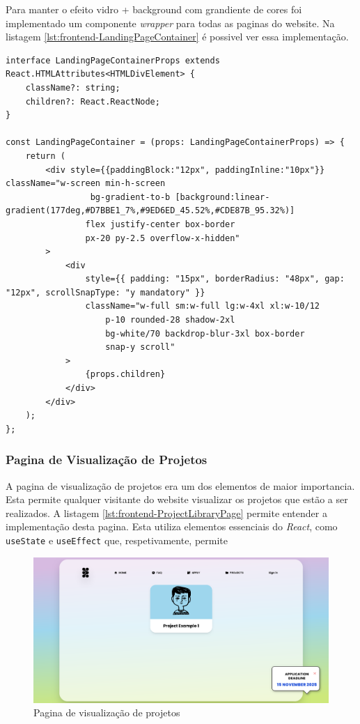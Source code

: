 Para manter o efeito vidro + background com grandiente de cores foi implementado um componente \textit{wrapper} para todas as paginas do website. Na listagem \ref{lst:frontend-LandingPageContainer} é possivel ver essa implementação.

\begin{lstlisting}[caption={Função LandingPageContainer}, label={lst:frontend-LandingPageContainer}]
interface LandingPageContainerProps extends React.HTMLAttributes<HTMLDivElement> {
	className?: string;
    children?: React.ReactNode;
}

const LandingPageContainer = (props: LandingPageContainerProps) => {
    return (
        <div style={{paddingBlock:"12px", paddingInline:"10px"}} className="w-screen min-h-screen
            	 bg-gradient-to-b [background:linear-gradient(177deg,#D7BBE1_7%,#9ED6ED_45.52%,#CDE87B_95.32%)]
            	flex justify-center box-border
				px-20 py-2.5 overflow-x-hidden"
		>
			<div
				style={{ padding: "15px", borderRadius: "48px", gap: "12px", scrollSnapType: "y mandatory" }}
				className="w-full sm:w-full lg:w-4xl xl:w-10/12
            		p-10 rounded-28 shadow-2xl
            		bg-white/70 backdrop-blur-3xl box-border
					snap-y scroll"
			>
				{props.children}
			</div>
		</div>
    );
};
\end{lstlisting}

\subsubsection{Pagina de Visualização de Projetos}

A pagina de visualização de projetos era um dos elementos de maior importancia. Esta permite qualquer visitante do website visualizar os projetos que estão a ser realizados. A listagem \ref{lst:frontend-ProjectLibraryPage} permite entender a implementação desta pagina. Esta utiliza elementos essenciais do \textit{React}, como \lstinline|useState| e \lstinline|useEffect| que, respetivamente, permite 

\begin{figure}[h!tbp]
    \centering
    \includegraphics[width=\linewidth]{capitulos/cap4-implementacao/assets/frontend/blended-project-page.png}
    \caption{Pagina de visualização de projetos}
    \label{fig:frontend-project-page}
\end{figure}

